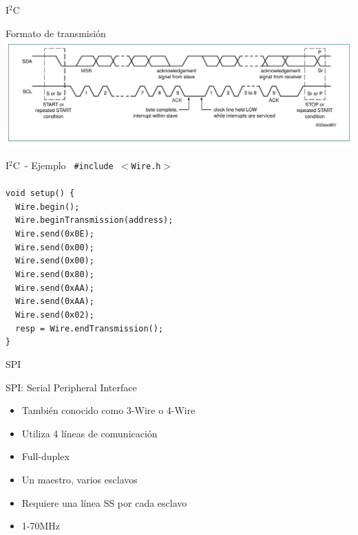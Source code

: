 \documentclass[xcolor=dvipsnames, handout]{beamer}
\newcommand{\iic}{I\ensuremath{^2}C\ }
\newcommand{\pageframe}[1]{\frame{\begin{center}{ \Huge #1 }\end{center}}}
\begin{document}
\begin{frame}{\iic}
 \begin{block}{Formato de transmisión}
  \includegraphics[width=\textwidth]{i2c-trans}
 \end{block}

\end{frame}

\begin{frame}{\iic - Ejemplo}
\texttt{
\noindent\#include $<$Wire.h$>$\\
~\\
void setup() \{\\
~~Wire.begin();\\
~~Wire.beginTransmission(address);\\
~~Wire.send(0x0E);\\
~~Wire.send(0x00);\\
~~Wire.send(0x00);\\
~~Wire.send(0x80);\\
~~Wire.send(0xAA);\\
~~Wire.send(0xAA);\\
~~Wire.send(0x02);\\
~~resp = Wire.endTransmission();\\
\}
}
\end{frame}




\pageframe{SPI}

\begin{frame}{SPI}
  \begin{block}{SPI: Serial Peripheral Interface}
    \begin{itemize}[<+->]
     \item También conocido como 3-Wire o 4-Wire
      \item Utiliza 4 líneas de comunicación
      \item Full-duplex
      \item Un maestro, varios esclavos
      \item Requiere una línea SS por cada esclavo
      \item 1-70MHz
    \end{itemize}

  \end{block}
\end{frame}
\end{document}
